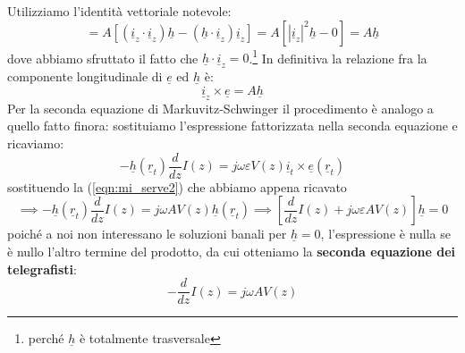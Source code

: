 \documentclass{book}
\begin{document}
    Utilizziamo l'identità vettoriale notevole:
    \begin{equation}
        = A [(\underline{i}_{z} \cdot \underline{i}_{z})\underline{h}-(\underline{h}\cdot \underline{i}_{z})\underline{i}_{z}]
        = A[|\underline{i}_{z}|^{2}\underline{h}-0] = A\underline{h}
    \end{equation}
    dove abbiamo sfruttato il fatto che $\underline{h} \cdot \underline{i}_{z} = 0$.\footnote{perché $\underline{h}$ è totalmente trasversale}
    In definitiva la relazione fra la componente longitudinale di $\underline{e}$ ed $\underline{h}$ è:
    \begin{equation}
        \label{eqn:mi_serve2}
        \underline{i}_{z} \times \underline{e} = A \underline{h}
    \end{equation}
    Per la seconda equazione di Markuvitz-Schwinger il procedimento è analogo a quello fatto finora: sostituiamo l'espressione fattorizzata nella
    seconda equazione e ricaviamo:
    \begin{equation}
        -\underline{h}(\underline{r}_{t}) \frac{d}{dz}I(z)= j \omega \varepsilon V(z) \underline{i}_{t} \times \underline{e}(\underline{r}_{t})
    \end{equation}
    sostituendo la (\ref{eqn:mi_serve2}) che abbiamo appena ricavato
    \begin{equation}
        \implies -\underline{h}(\underline{r}_{t}) \frac{d}{dz}I(z) = j \omega AV(z)\underline{h}(\underline{r}_{t})
        \implies [\frac{d}{dz}I(z)+j\omega \varepsilon A V(z)]\underline{h} = 0
    \end{equation}
    poiché a noi non interessano le soluzioni banali per $\underline{h} = 0$, l'espressione è nulla se è nullo l'altro termine del prodotto, da
    cui otteniamo la \textbf{seconda equazione dei telegrafisti}:
    \begin{equation}
        -\frac{d}{dz}I(z) = j \omega A V(z)
    \end{equation}
\end{document}
